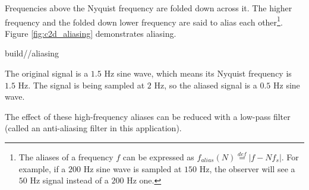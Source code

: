 Frequencies above the Nyquist frequency are folded down across it. The higher
frequency and the folded down lower frequency are said to alias each
other\footnote{The aliases of a frequency $f$ can be expressed as
$f_{alias}(N) \stackrel{def}{=} |f - Nf_s|$. For example, if a $200$ Hz sine
wave is sampled at $150$ Hz, the \gls{observer} will see a $50$ Hz signal
instead of a $200$ Hz one.}. Figure \ref{fig:c2d_aliasing} demonstrates
aliasing.
\begin{svg}{build/\chapterpath/aliasing}
  \caption{The original signal is a $1.5$ Hz sine wave, which means its Nyquist
    frequency is $1.5$ Hz. The signal is being sampled at $2$ Hz, so the aliased
    signal is a $0.5$ Hz sine wave.}
    \label{fig:c2d_aliasing}
\end{svg}

The effect of these high-frequency aliases can be reduced with a low-pass filter
(called an anti-aliasing filter in this application).
